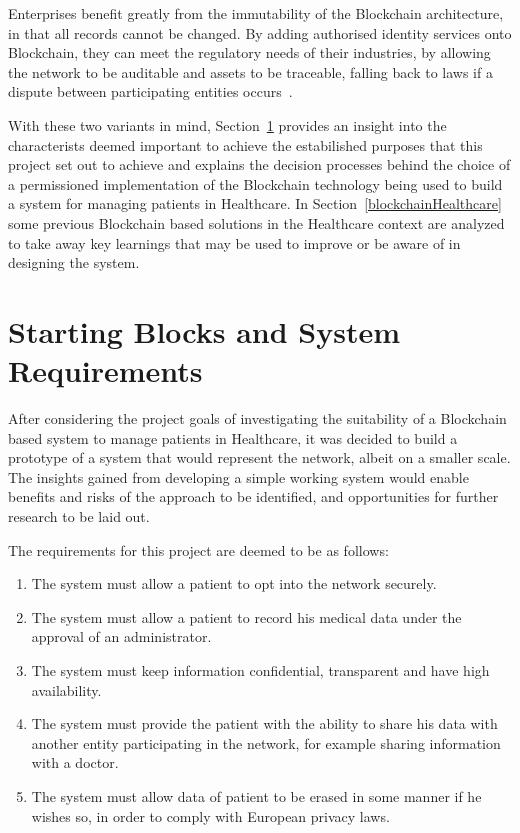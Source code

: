 Enterprises benefit greatly from the immutability of the Blockchain
architecture, in that all records cannot be changed. By adding authorised
identity services onto Blockchain, they can meet the regulatory needs of their
industries, by allowing the network to be auditable and assets to be traceable,
falling back to laws if a dispute between participating entities
occurs~\cite{Barclay2017}.

With these two variants in mind, Section~\ref{choosingHyperledger} provides an
insight into the characterists deemed important to achieve the estabilished
purposes that this project set out to achieve and explains the decision
processes behind the choice of a permissioned implementation of the Blockchain
technology being used to build a system for managing patients in Healthcare. In
Section~\ref{blockchainHealthcare} some previous Blockchain based solutions in
the Healthcare context are analyzed to take away key learnings that may be used
to improve or be aware of in designing the system.

\section{Starting Blocks and System Requirements}\label{choosingHyperledger}

After considering the project goals of investigating the suitability of a
Blockchain based system to manage patients in Healthcare, it was decided to
build a prototype of a system that would represent the network, albeit on a
smaller scale. The insights gained from developing a simple working system
would enable benefits and risks of the approach to be identified, and
opportunities for further research to be laid out.

The requirements for this project are deemed to be as follows:

\renewcommand{\labelenumi}{\Roman{enumi}.}
\begin{enumerate}
  \item The system must allow a patient to opt into the network securely.
  \item The system must allow a patient to record his medical data under the
    approval of an administrator.
  \item The system must keep information confidential, transparent and have
    high availability.
  \item The system must provide the patient with the ability to share his data
    with another entity participating in the network, for example sharing
    information with a doctor.
  \item The system must allow data  of patient to be erased in some manner if
    he wishes so, in order to comply with European privacy laws.
\end{enumerate}


